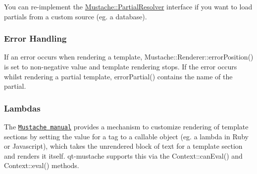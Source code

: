 You can re-\/implement the {\ttfamily \hyperlink{classMustache_1_1PartialResolver}{Mustache\-::\-Partial\-Resolver}} interface if you want to load partials from a custom source (eg. a database).

\subsubsection*{Error Handling}

If an error occurs when rendering a template, {\ttfamily Mustache\-::\-Renderer\-::error\-Position()} is set to non-\/negative value and template rendering stops. If the error occurs whilst rendering a partial template, {\ttfamily error\-Partial()} contains the name of the partial.

\subsubsection*{Lambdas}

The \href{http://mustache.github.com/mustache.5.html}{\tt Mustache manual} provides a mechanism to customize rendering of template sections by setting the value for a tag to a callable object (eg. a lambda in Ruby or Javascript), which takes the unrendered block of text for a template section and renders it itself. qt-\/mustache supports this via the {\ttfamily Context\-::can\-Eval()} and {\ttfamily Context\-::eval()} methods. 